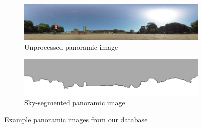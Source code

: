 \documentclass[letterpaper]{article}
\begin{document}
\begin{figure}[t]
    \begin{subfigure}[b]{\columnwidth}
        \includegraphics[width=\columnwidth]{figures/360_240.jpg}
        \caption{Unprocessed panoramic image}
    \end{subfigure}
    \begin{subfigure}[b]{\columnwidth}
        \includegraphics[width=\columnwidth]{figures/360_240_mask.png}
        \caption{Sky-segmented panoramic image}
    \end{subfigure}
    \caption{Example panoramic images from our database}
    \label{fig:database_images}
\end{figure}
\end{document}
